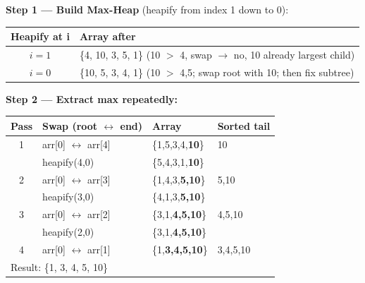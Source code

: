 \documentclass[12pt,a4paper,oneside]{book}
\begin{document}
\begin{dryrun}[Dry Run: arr = \{4, 10, 3, 5, 1\}]
\textbf{Step 1 — Build Max-Heap} (heapify from index 1 down to 0):

\begin{center}
\begin{tabular}{cl}
\toprule
\textbf{Heapify at i} & \textbf{Array after}\\
\midrule
$i=1$ & \{4, 10, 3, 5, 1\} \quad (10 $>$ 4, swap $\to$ no, 10 already largest child)\\
$i=0$ & \{10, 5, 3, 4, 1\} \quad (10 $>$ 4,5; swap root with 10; then fix subtree)\\
\bottomrule
\end{tabular}
\end{center}

\textbf{Step 2 — Extract max repeatedly:}

\begin{center}
\begin{tabular}{clll}
\toprule
\textbf{Pass} & \textbf{Swap (root $\leftrightarrow$ end)} & \textbf{Array} & \textbf{Sorted tail}\\
\midrule
1 & arr[0] $\leftrightarrow$ arr[4] & \{1,5,3,4,\textbf{10}\} & 10\\
  & heapify(4,0) & \{5,4,3,1,\textbf{10}\} & \\
2 & arr[0] $\leftrightarrow$ arr[3] & \{1,4,3,\textbf{5,10}\} & 5,10\\
  & heapify(3,0) & \{4,1,3,\textbf{5,10}\} & \\
3 & arr[0] $\leftrightarrow$ arr[2] & \{3,1,\textbf{4,5,10}\} & 4,5,10\\
  & heapify(2,0) & \{3,1,\textbf{4,5,10}\} & \\
4 & arr[0] $\leftrightarrow$ arr[1] & \{1,\textbf{3,4,5,10}\} & 3,4,5,10\\
\midrule
\multicolumn{4}{l}{Result: \{1, 3, 4, 5, 10\}}\\
\bottomrule
\end{tabular}
\end{center}
\end{dryrun}
\end{document}
